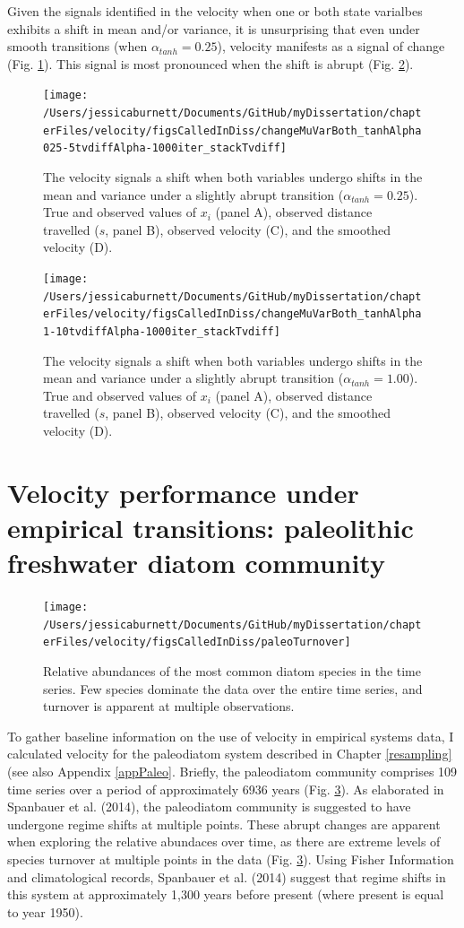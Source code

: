 \documentclass[12pt,twoside,openany]{reedthesis}
\begin{document}
Given the signals identified in the velocity when one or both state varialbes exhibits a shift in mean and/or variance, it is unsurprising that even under smooth transitions (when \(\alpha_{tanh} = 0.25\)), velocity manifests as a signal of change (Fig. \ref{fig:muVarBoth25}). This signal is most pronounced when the shift is abrupt (Fig. \ref{fig:muVarBoth1}).
\begin{figure}
\texttt{[image: /Users/jessicaburnett/Documents/GitHub/myDissertation/chapterFiles/velocity/figsCalledInDiss/changeMuVarBoth\_tanhAlpha025-5tvdiffAlpha-1000iter\_stackTvdiff]} \caption{The velocity signals a shift when both variables undergo shifts in the mean and variance under a slightly abrupt transition ($\alpha_{tanh}=0.25$). True and observed values of $x_i$ (panel A), observed distance travelled ($s$, panel B), observed velocity (C), and the smoothed velocity (D).}\label{fig:muVarBoth25}
\end{figure}
\begin{figure}
\texttt{[image: /Users/jessicaburnett/Documents/GitHub/myDissertation/chapterFiles/velocity/figsCalledInDiss/changeMuVarBoth\_tanhAlpha1-10tvdiffAlpha-1000iter\_stackTvdiff]} \caption{The velocity signals a shift when both variables undergo shifts in the mean and variance under a slightly abrupt transition ($\alpha_{tanh}=1.00$). True and observed values of $x_i$ (panel A), observed distance travelled ($s$, panel B), observed velocity (C), and the smoothed velocity (D).}\label{fig:muVarBoth1}
\end{figure}
\hypertarget{velocity-performance-under-empirical-transitions-paleolithic-freshwater-diatom-community}{%
\section{Velocity performance under empirical transitions: paleolithic freshwater diatom community}\label{velocity-performance-under-empirical-transitions-paleolithic-freshwater-diatom-community}}
\begin{figure}
\texttt{[image: /Users/jessicaburnett/Documents/GitHub/myDissertation/chapterFiles/velocity/figsCalledInDiss/paleoTurnover]} \caption{Relative abundances of the most common diatom species in the time series. Few species dominate the data over the entire time series, and turnover is apparent at multiple observations.}\label{fig:paleoTurnover}
\end{figure}
To gather baseline information on the use of velocity in empirical systems data, I calculated velocity for the paleodiatom system described in Chapter \ref{resampling} (see also Appendix \ref{appPaleo}. Briefly, the paleodiatom community comprises 109 time series over a period of approximately 6936 years (Fig. \ref{fig:paleoTurnover}). As elaborated in Spanbauer et al. (2014), the paleodiatom community is suggested to have undergone regime shifts at multiple points. These abrupt changes are apparent when exploring the relative abundaces over time, as there are extreme levels of species turnover at multiple points in the data (Fig. \ref{fig:paleoTurnover}). Using Fisher Information and climatological records, Spanbauer et al. (2014) suggest that regime shifts in this system at approximately 1,300 years before present (where present is equal to year 1950).
\end{document}
